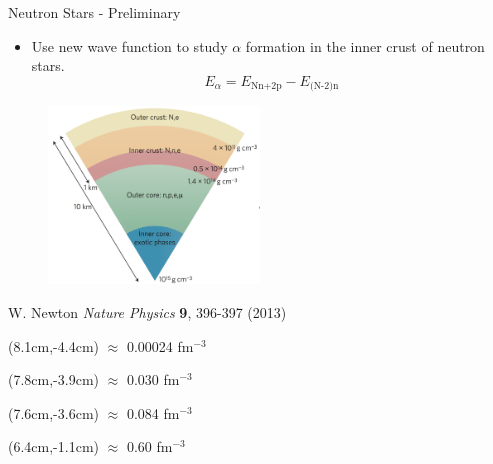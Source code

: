 \documentclass{beamer}
\begin{document}
\begin{frame}{Neutron Stars - Preliminary}
\begin{itemize}
   \item Use new wave function to study $\alpha$ formation in the inner crust of neutron stars.
   \begin{equation*}
      E_\alpha = E_\text{Nn+2p} - E_\text{(N-2)n}
   \end{equation*}
\end{itemize}
\vspace{-0.5cm}
\begin{figure}[h]
   \centering
   \includegraphics[width=0.5\textwidth]{figures/neutronstar.png}
\end{figure}
{\tiny W. Newton {\it Nature Physics} {\bf 9}, 396-397 (2013)}
\begin{textblock*}{\textwidth}(8.1cm,-4.4cm) %
   \tiny $\approx$ 0.00024 fm$^{-3}$
\end{textblock*}
\begin{textblock*}{\textwidth}(7.8cm,-3.9cm) %
   \tiny $\approx$ 0.030 fm$^{-3}$
\end{textblock*}
\begin{textblock*}{\textwidth}(7.6cm,-3.6cm) %
   \tiny $\approx$ 0.084 fm$^{-3}$
\end{textblock*}
\begin{textblock*}{\textwidth}(6.4cm,-1.1cm) %
   \tiny $\approx$ 0.60 fm$^{-3}$
\end{textblock*}
\end{frame}
\end{document}
